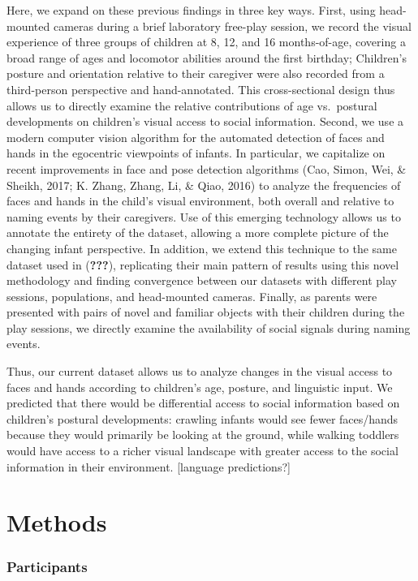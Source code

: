 \documentclass[english,man,floatsintext,draftall]{apa6}
\begin{document}
Here, we expand on these previous findings in three key ways. First,
using head-mounted cameras during a brief laboratory free-play session,
we record the visual experience of three groups of children at 8, 12,
and 16 months-of-age, covering a broad range of ages and locomotor
abilities around the first birthday; Children's posture and orientation
relative to their caregiver were also recorded from a third-person
perspective and hand-annotated. This cross-sectional design thus allows
us to directly examine the relative contributions of age vs.~postural
developments on children's visual access to social information. Second,
we use a modern computer vision algorithm for the automated detection of
faces and hands in the egocentric viewpoints of infants. In particular,
we capitalize on recent improvements in face and pose detection
algorithms (Cao, Simon, Wei, \& Sheikh, 2017; K. Zhang, Zhang, Li, \&
Qiao, 2016) to analyze the frequencies of faces and hands in the child's
visual environment, both overall and relative to naming events by their
caregivers. Use of this emerging technology allows us to annotate the
entirety of the dataset, allowing a more complete picture of the
changing infant perspective. In addition, we extend this technique to
the same dataset used in ({\textbf{???}}), replicating their main
pattern of results using this novel methodology and finding convergence
between our datasets with different play sessions, populations, and
head-mounted cameras. Finally, as parents were presented with pairs of
novel and familiar objects with their children during the play sessions,
we directly examine the availability of social signals during naming
events.

Thus, our current dataset allows us to analyze changes in the visual
access to faces and hands according to children's age, posture, and
linguistic input. We predicted that there would be differential access
to social information based on children's postural developments:
crawling infants would see fewer faces/hands because they would
primarily be looking at the ground, while walking toddlers would have
access to a richer visual landscape with greater access to the social
information in their environment. {[}language predictions?{]}

\section{Methods}\label{methods}

\subsubsection{Participants}\label{participants}
\end{document}
